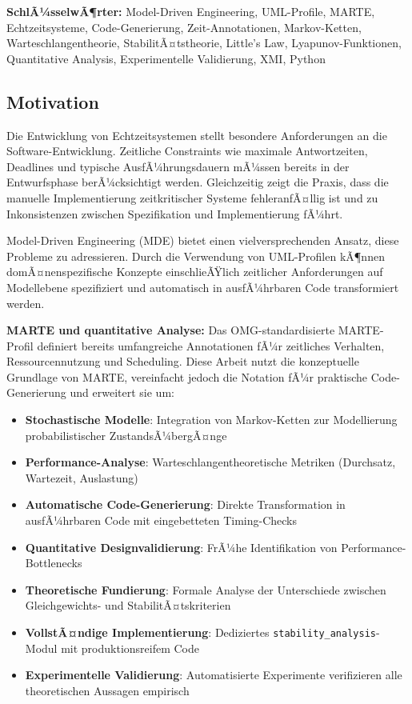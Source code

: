 ﻿\documentclass[a4paper,12pt]{scrreprt}
\theoremstyle{definition}
\begin{document}
\textbf{SchlÃ¼sselwÃ¶rter:} Model-Driven Engineering, UML-Profile, MARTE,
Echtzeitsysteme, Code-Gene\-rierung, Zeit-Annotationen, Markov-Ketten,
Warteschlangentheorie, StabilitÃ¤tstheorie, Little's Law, Lyapunov-Funktionen,
Quantitative Analysis, Experimentelle Validierung, XMI, Python


\subsection{Motivation}

Die Entwicklung von Echtzeitsystemen stellt besondere Anforderungen an die Software-Entwicklung. Zeitliche Constraints wie maximale Antwortzeiten, Deadlines und typische AusfÃ¼hrungsdauern mÃ¼ssen bereits in der Entwurfsphase berÃ¼cksichtigt werden. Gleichzeitig zeigt die Praxis, dass die manuelle Implementierung zeitkritischer Systeme fehleranfÃ¤llig ist und zu Inkonsistenzen zwischen Spezifikation und Implementierung fÃ¼hrt.

Model-Driven Engineering (MDE) bietet einen vielversprechenden Ansatz, diese Probleme zu adressieren. Durch die Verwendung von UML-Profilen kÃ¶nnen domÃ¤nenspezifische Konzepte einschlieÃŸlich zeitlicher Anforderungen auf Modellebene spezifiziert und automatisch in ausfÃ¼hrbaren Code transformiert werden.

\textbf{MARTE und quantitative Analyse:} Das OMG-standardisierte MARTE-Profil \cite{marte} definiert bereits umfangreiche Annotationen fÃ¼r zeitliches Verhalten, Ressourcennutzung und Scheduling. Diese Arbeit nutzt die konzeptuelle Grundlage von MARTE, vereinfacht jedoch die Notation fÃ¼r praktische Code-Generierung und erweitert sie um:

\begin{itemize}
	\item[-] \textbf{Stochastische Modelle}: Integration von Markov-Ketten
	zur Modellierung probabilistischer ZustandsÃ¼bergÃ¤nge
	\item[-] \textbf{Performance-Analyse}: Warteschlangentheoretische Metriken
	(Durchsatz, Wartezeit, Auslastung)
	\item[-] \textbf{Automatische Code-Generierung}: Direkte Transformation in
	ausfÃ¼hrbaren Code mit eingebetteten Timing-Checks
	\item[-] \textbf{Quantitative Designvalidierung}: FrÃ¼he Identifikation von
	Performance-Bottle\-necks
	\item[-] \textbf{Theoretische Fundierung}: Formale Analyse der Unterschiede
	zwischen Gleichge\-wichts- und StabilitÃ¤tskriterien
	\item[-] \textbf{VollstÃ¤ndige Implementierung}: Dediziertes
	\texttt{stability\_analysis}-Modul mit produktionsreifem Code
	\item[-] \textbf{Experimentelle Validierung}: Automatisierte Experimente
	verifizieren alle theoretischen Aussagen empirisch
\end{itemize}
\end{document}
